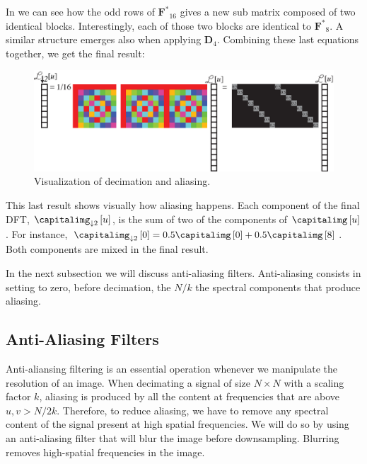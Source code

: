 In \fig{\ref{fig:decimationFT_inmatrixform}} we can see how the odd rows of $\mathbf{F^*}_{16}$ gives a new sub matrix composed of two identical blocks. Interestingly, each of those two blocks are identical to $\mathbf{F^*}_{8}$. A similar structure emerges also when applying $\mathbf{D}_4$. Combining these last equations together, we get the final result:
\begin{figure}[h!]
\centerline{
\includegraphics[width=0.9\linewidth]{figures/upsamplig_downsampling/decimation_finalequations_inmatrixform2.eps}
}
\caption{Visualization of decimation and aliasing.}
\label{fig:decimation_finalequations_inmatrixform}
\end{figure}

This last result shows visually how aliasing happens. Each component of the final DFT, $\capitalimg_{\downarrow 2} \left[u\right]$, is the sum of two of the components of $\capitalimg \left[u\right]$. For instance, $\capitalimg_{\downarrow 2} \left[0\right] = 0.5 \capitalimg \left[0\right] + 0.5 \capitalimg \left[8\right]$. Both components are mixed in the final result. 

In the next subsection we will discuss anti-aliasing filters. Anti-aliasing consists in setting to zero, before decimation, the $N/k$ the spectral components that produce aliasing. 

\subsection{Anti-Aliasing Filters}

Anti-aliansing filtering is an essential operation whenever we manipulate the resolution of an image. When decimating a signal of size $N \times N$ with a scaling factor $k$, aliasing is produced by all the content at frequencies that are above $u,v > N/2k$. Therefore, to reduce aliasing, we have to remove any spectral content of the signal present at high spatial frequencies. We will do so by using an anti-aliasing filter that will blur the image before downsampling. Blurring removes high-spatial frequencies in the image. 

